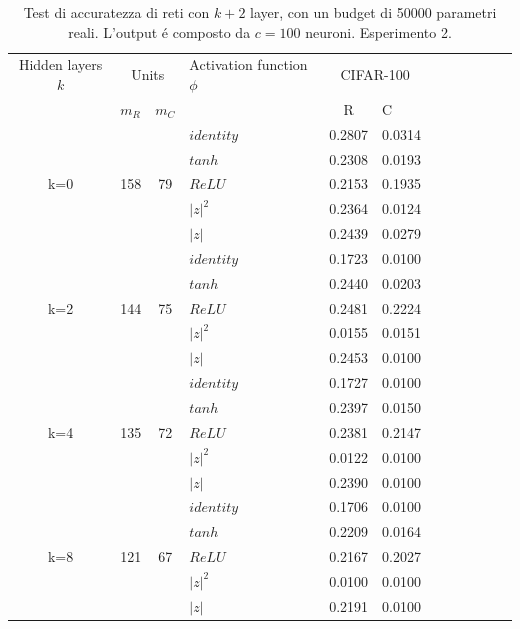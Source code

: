 \documentclass[a4paper,10pt]{article}
\begin{document}
 \begin{table}
  \centering
  \begin{tabular}{cp{} cp{} cp{}   cp{} cp{} cp{}}
   \cline{1-6}
   Hidden layers $k$ & \multicolumn{2}{c}{Units} $p_R$ & Activation function $\phi$ & \multicolumn{2}{c}{CIFAR-100}\\
   \cline{2-3} \cline{5-6}
   & $m_R$ & $m_C$ & & R & C \\
   \cline{1-6}
   & & & $identity$ & 0.2807 & 0.0314 \\
   \cline{4-6}
   & & & $tanh$ & 0.2308 & 0.0193 \\
   \cline{4-6}
   k=0 & 158 & 79 & $ReLU$ & 0.2153 & 0.1935 \\
   \cline{4-6}
   & & & $|z|^2$ & 0.2364 & 0.0124 \\
   \cline{4-6}
   & & & $|z|$ & 0.2439 & 0.0279 \\
   \cline{1-6}
   
   \cline{1-6}
   & & & $identity$ & 0.1723 & 0.0100 \\
   \cline{4-6}
   & & & $tanh$ & 0.2440 & 0.0203 \\
   \cline{4-6}
   k=2 & 144 & 75 & $ReLU$ & 0.2481 & 0.2224 \\
   \cline{4-6}
   & & & $|z|^2$ & 0.0155 & 0.0151 \\
   \cline{4-6}
   & & & $|z|$ & 0.2453 & 0.0100 \\
   \cline{1-6}
   
   \cline{1-6}
   & & & $identity$ & 0.1727 & 0.0100 \\
   \cline{4-6}
   & & & $tanh$ & 0.2397 & 0.0150 \\
   \cline{4-6}
   k=4 & 135 & 72 & $ReLU$ & 0.2381 & 0.2147 \\
   \cline{4-6}
   & & & $|z|^2$ & 0.0122 & 0.0100 \\
   \cline{4-6}
   & & & $|z|$ & 0.2390 & 0.0100 \\
   \cline{1-6}
   
   \cline{1-6}
   & & & $identity$ & 0.1706 & 0.0100 \\
   \cline{4-6}
   & & & $tanh$ & 0.2209 & 0.0164 \\
   \cline{4-6}
   k=8 & 121 & 67 & $ReLU$ & 0.2167 & 0.2027 \\
   \cline{4-6}
   & & & $|z|^2$ & 0.0100 & 0.0100 \\
   \cline{4-6}
   & & & $|z|$ & 0.2191 & 0.0100 \\
   \cline{1-6}
      
  \end{tabular}
  \caption{Test di accuratezza di reti con $k+2$ layer, con un budget di 50000 parametri reali. L'output \'e composto da $c=100$ neuroni. Esperimento 2.}
  \label{CIFAR-1002Tab}
 \end{table}
 
\end{document}
